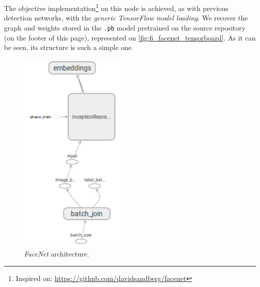 		The objective implementation\footnote{Inspired on:  \url{https://github.com/davidsandberg/facenet}} on this node is achieved, as with previous detection networks, with the \emph{generic TensorFlow model loading}. We recover the graph and weights stored in the \texttt{.pb} model pretrained on the source repository (on the footer of this page), represented on \autoref{fig:6_facenet_tensorboard}. As it can be seen, its structure is such a simple one.
		
		\begin{figure}[h]
			\centering
			\includegraphics[width=2in]{images/facenet_tensorboard}
			\caption{\emph{FaceNet} architecture.}
			\label{fig:6_facenet_tensorboard}
		\end{figure}

